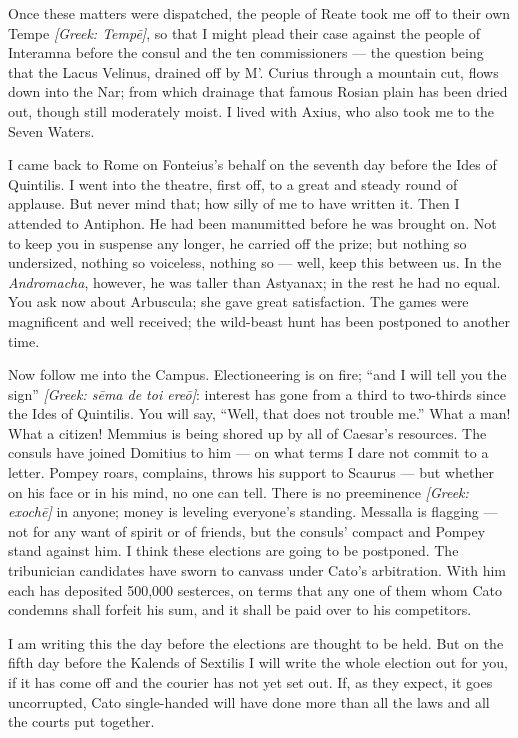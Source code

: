  Once these matters were dispatched, the people of Reate took me off to their own Tempe \textit{[Greek: Tempē]}, so that I might plead their case against the people of Interamna before the consul and the ten commissioners --- the question being that the Lacus Velinus, drained off by M'. Curius through a mountain cut, flows down into the Nar; from which drainage that famous Rosian plain has been dried out, though still moderately moist. I lived with Axius, who also took me to the Seven Waters.

 I came back to Rome on Fonteius's behalf on the seventh day before the Ides of Quintilis. I went into the theatre, first off, to a great and steady round of applause. But never mind that; how silly of me to have written it. Then I attended to Antiphon. He had been manumitted before he was brought on. Not to keep you in suspense any longer, he carried off the prize; but nothing so undersized, nothing so voiceless, nothing so --- well, keep this between us. In the \textit{Andromacha}, however, he was taller than Astyanax; in the rest he had no equal. You ask now about Arbuscula; she gave great satisfaction. The games were magnificent and well received; the wild-beast hunt has been postponed to another time.

 Now follow me into the Campus. Electioneering is on fire; ``and I will tell you the sign'' \textit{[Greek: sēma de toi ereō]}: interest has gone from a third to two-thirds since the Ides of Quintilis. You will say, ``Well, that does not trouble me.'' What a man! What a citizen! Memmius is being shored up by all of Caesar's resources. The consuls have joined Domitius to him --- on what terms I dare not commit to a letter. Pompey roars, complains, throws his support to Scaurus --- but whether on his face or in his mind, no one can tell. There is no preeminence \textit{[Greek: exochē]} in anyone; money is leveling everyone's standing. Messalla is flagging --- not for any want of spirit or of friends, but the consuls' compact and Pompey stand against him. I think these elections are going to be postponed. The tribunician candidates have sworn to canvass under Cato's arbitration. With him each has deposited 500,000 sesterces, on terms that any one of them whom Cato condemns shall forfeit his sum, and it shall be paid over to his competitors.

 I am writing this the day before the elections are thought to be held. But on the fifth day before the Kalends of Sextilis I will write the whole election out for you, if it has come off and the courier has not yet set out. If, as they expect, it goes uncorrupted, Cato single-handed will have done more than all the laws and all the courts put together.

